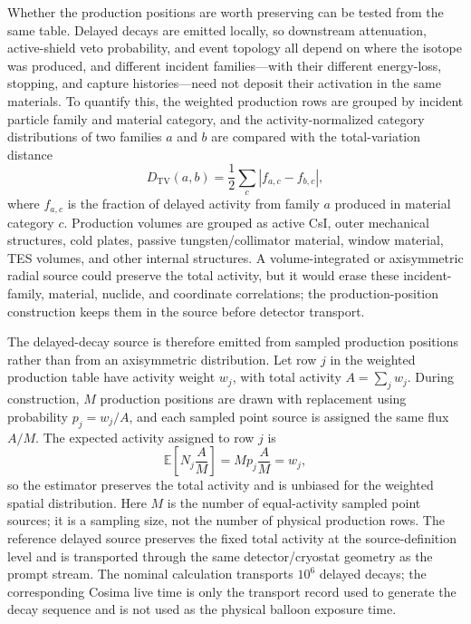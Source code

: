 \documentclass[11pt]{article}
\begin{document}
Whether the production positions are worth preserving can be tested from the
same table. Delayed decays are emitted locally, so downstream attenuation,
active-shield veto probability, and event topology all depend on where the
isotope was produced, and different incident families---with their different
energy-loss, stopping, and capture histories---need not deposit their
activation in the same materials. To quantify this, the weighted production
rows are grouped by incident particle family and material category, and the
activity-normalized category distributions of two families $a$ and $b$ are
compared with the total-variation distance
\begin{equation}
  D_{\mathrm{TV}}(a,b) =
  \frac{1}{2}\sum_c \left| f_{a,c} - f_{b,c} \right| ,
\end{equation}
where $f_{a,c}$ is the fraction of delayed activity from family $a$ produced
in material category $c$. Production volumes are grouped as active CsI,
outer mechanical structures, cold plates, passive tungsten/collimator material,
window material, TES volumes, and other internal structures. A volume-integrated
or axisymmetric radial source could preserve the total
activity, but it would erase these incident-family, material, nuclide, and
coordinate correlations; the production-position construction keeps them in
the source before detector transport.

The delayed-decay source is therefore emitted from sampled production positions
rather than from an axisymmetric distribution. Let row $j$ in the weighted
production table have activity weight $w_j$, with total activity
$A=\sum_j w_j$. During construction, $M$ production positions are drawn with
replacement using probability $p_j=w_j/A$, and each sampled point source is
assigned the same flux $A/M$. The expected activity assigned to row $j$ is
\begin{equation}
  \mathbb{E}\!\left[N_j\frac{A}{M}\right] = M p_j \frac{A}{M} = w_j ,
\end{equation}
so the estimator preserves the total activity and is unbiased for the weighted
spatial distribution. Here $M$ is the number of equal-activity sampled point
sources; it is a sampling size, not the number of physical production rows. The
reference delayed source preserves the fixed total activity at the
source-definition level and is transported through the same detector/cryostat
geometry as the prompt stream. The nominal calculation transports $10^6$
delayed decays; the corresponding Cosima live time is only the transport record
used to generate the decay sequence and is not used as the physical balloon
exposure time.
\end{document}
